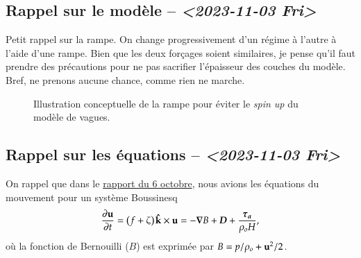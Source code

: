 \documentclass[10pt]{article}
\numberwithin{equation}{section}
\newcommand{\kvf}{\vb{\hat{k}}}
\newcommand{\uu}{\vb{u}}
\newcommand{\pt}{\hspace{1pt}} %
\begin{document}
\subsection{Rappel sur le modèle -- \textit{<2023-11-03 Fri>}}
\label{sec:org94f4eb8}

Petit rappel sur la rampe.
On change progressivement d'un régime à l'autre à l'aide d'une rampe.
Bien que les deux forçages soient similaires, je pense qu'il faut prendre des précautions pour ne pas sacrifier l'épaisseur des couches du modèle.
Bref, ne prenons aucune chance, comme rien ne marche.

\begin{figure}
\begin{center}
\end{center}
\caption{\label{orgd83434a}Illustration conceptuelle de la rampe pour éviter le \emph{spin up} du modèle de vagues.}
\end{figure}

\subsection{Rappel sur les équations -- \textit{<2023-11-03 Fri>}}
\label{sec:orge0a6d03}

On rappel que dans le \href{rapport-2023-10-06.org}{rapport du 6 octobre}, nous avions les équations du mouvement pour un système Boussinesq
\begin{equation}
\label{eq:orge2f0537}
   \pdv{\uu}{t} = \qty(f+\zeta)\pt \kvf\times\uu = -\gradient{B} + \boldsymbol{D} + \frac{\boldsymbol{\tau_a}}{\rho_o H},
\end{equation}
où la fonction de Bernouilli (\(B\)) est exprimée par \(B = p/\rho_o + \uu^2/2\).\bigskip
\end{document}
